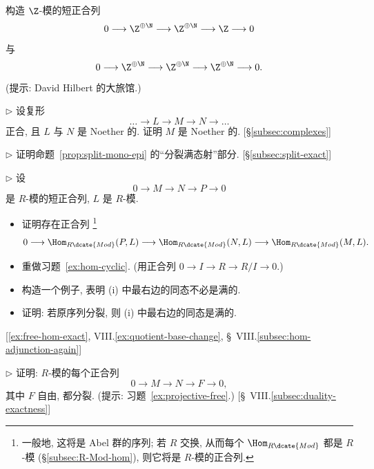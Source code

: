 \begin{prob}
\label{ex:Hilbert-hotel}
构造 $\Z$-模的短正合列
\[
0 \longrightarrow \Z^{\oplus \N} \longrightarrow \Z^{\oplus \N} \longrightarrow \Z \longrightarrow 0
\]
与
\[
0 \longrightarrow \Z^{\oplus \N} \longrightarrow \Z^{\oplus \N} \longrightarrow \Z^{\oplus \N} \longrightarrow 0.
\]
(提示: David Hilbert 的大旅馆.)
\end{prob}

\begin{prob}
\label{ex:noetherian-middle}
$\triangleright$ 设复形
\[
\dots \longrightarrow L \longrightarrow M \longrightarrow N \longrightarrow \dots
\]
正合, 且 $L$ 与 $N$ 是 Noether 的. 证明 $M$ 是 Noether 的. [\S\ref{subsec:complexes}]
\end{prob}

\begin{prob}
\label{ex:split-epi}
$\triangleright$ 证明命题~\ref{prop:split-mono-epi} 的``分裂满态射''部分. [\S\ref{subsec:split-exact}]
\end{prob}

\begin{prob}
\label{ex:hom-left-exact}
$\triangleright$ 设
\[
0 \longrightarrow M \longrightarrow N \longrightarrow P \longrightarrow 0
\]
是 $R$-模的短正合列, $L$ 是 $R$-模.
\begin{itemize}
	\item[(i)] 证明存在正合列%
	\footnote{一般地, 这将是 Abel 群的序列; 若 $R$ 交换, 从而每个 $\Hom_{R\dcate{Mod}}$ 都是 $R$-模 (\S\ref{subsec:R-Mod-hom}), 则它将是 $R$-模的正合列.}
	\[
	0 \longrightarrow \Hom_{R\dcate{Mod}}(P, L) \longrightarrow \Hom_{R\dcate{Mod}}(N, L) \longrightarrow \Hom_{R\dcate{Mod}}(M, L).
	\]
	\item[(ii)] 重做习题~\ref{ex:hom-cyclic}. (用正合列 $0 \to I \to R \to R/I \to 0$.)
	\item[(iii)] 构造一个例子, 表明 (i) 中最右边的同态不必是满的.
	\item[(iv)] 证明: 若原序列分裂, 则 (i) 中最右边的同态是满的.
\end{itemize}
[\ref{ex:free-hom-exact}, VIII.\ref{ex:quotient-base-change}, \S~VIII.\ref{subsec:hom-adjunction-again}]
\end{prob}

\begin{prob}
\label{ex:free-splits}
$\triangleright$ 证明: $R$-模的每个正合列
\[
0 \longrightarrow M \longrightarrow N \longrightarrow F \longrightarrow 0,
\]
其中 $F$ 自由, 都分裂. (提示: 习题~\ref{ex:projective-free}.) [\S~VIII.\ref{subsec:duality-exactness}]
\end{prob}

